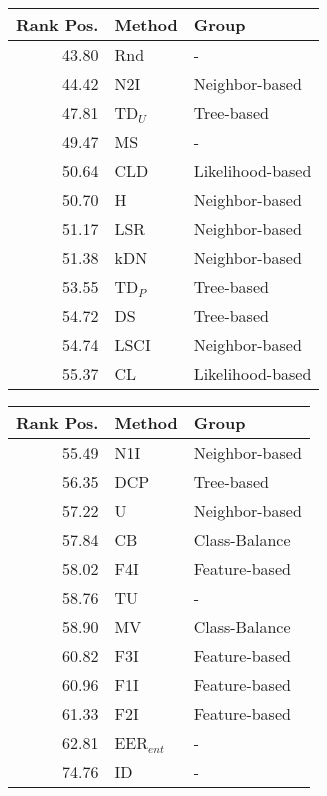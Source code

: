 \begin{tabular}{rll}
\toprule
Rank Pos. & Method & Group \\
\midrule
43.80 & Rnd & - \\
44.42 & N2I & Neighbor-based \\
47.81 & TD$_U$ & Tree-based \\
49.47 & MS & - \\
50.64 & CLD & Likelihood-based \\
50.70 & H & Neighbor-based \\
51.17 & LSR & Neighbor-based \\
51.38 & kDN & Neighbor-based \\
53.55 & TD$_P$ & Tree-based \\
54.72 & DS & Tree-based \\
54.74 & LSCI & Neighbor-based \\
55.37 & CL & Likelihood-based \\
\bottomrule
\end{tabular}
\begin{tabular}{rll}
\toprule
Rank Pos. & Method & Group \\
\midrule
55.49 & N1I & Neighbor-based \\
56.35 & DCP & Tree-based \\
57.22 & U & Neighbor-based \\
57.84 & CB & Class-Balance \\
58.02 & F4I & Feature-based \\
58.76 & TU & - \\
58.90 & MV & Class-Balance \\
60.82 & F3I & Feature-based \\
60.96 & F1I & Feature-based \\
61.33 & F2I & Feature-based \\
62.81 & EER$_{ent}$ & - \\
74.76 & ID & - \\
\bottomrule
\end{tabular}
